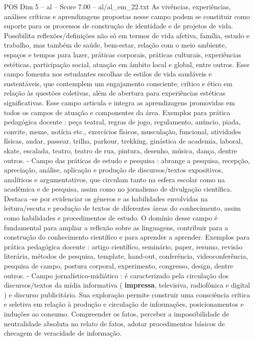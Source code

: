 \begin{textsample}{POS Dim 5 – al – Score 7.00 – al/al\_em\_22.txt}
As vivências, experiências, análises críticas e aprendizagens propostas nesse campo podem se constituir como suporte para os processos de construção de identidade e de projetos de vida.
Possibilita reflexões/definições não só em termos de vida afetiva, família, estudo e trabalho, mas também de saúde, bem-estar, relação com o meio ambiente, espaços e tempos para lazer, práticas corporais, práticas culturais, experiências estéticas, participação social, atuação em âmbito local e global, entre outros.
Esse campo fomenta nos estudantes escolhas de estilos de vida saudáveis e sustentáveis, que contemplem um engajamento consciente, crítico e ético em relação às questões coletivas, além de abertura para experiências estéticas significativas.
Esse campo articula e integra as aprendizagens promovidas em todos os campos de atuação e componentes da área.
Exemplos para prática pedagógica docente : peça teatral, regras de jogo, regulamento, anúncio, piada, convite, meme, notícia etc., exercícios físicos, musculação, funcional, atividades físicas, andar, passear, trilha, parkour, trekking, ginástica de academia, laboral, skate, escalada, teatro, teatro de rua, pintura, desenho, música, dança, dentre outros. - Campo das práticas de estudo e pesquisa : abrange a pesquisa, recepção, apreciação, análise, aplicação e produção de discursos/textos expositivos, analíticos e argumentativos, que circulam tanto na esfera escolar como na acadêmica e de pesquisa, assim como no jornalismo de divulgação científica.
Destaca -se por evidenciar os gêneros e as habilidades envolvidas na leitura/escuta e produção de textos de diferentes áreas do conhecimento, assim como habilidades e procedimentos de estudo.
O domínio desse campo é fundamental para ampliar a reflexão sobre as linguagens, contribuir para a construção do conhecimento científico e para aprender a aprender.
Exemplos para prática pedagógica docente : artigo científico, seminário, paper, resumo, revisão literária, métodos de pesquisa, template, hand-out, conferência, videoconferência, pesquisa de campo, postura corporal, experimento, congresso, design, dentre outros. - Campo jornalístico-midiático : é caracterizado pela circulação dos discursos/textos da mídia informativa ( \textbf{impressa}, televisiva, radiofônica e digital ) e discurso publicitário.
Sua exploração permite construir uma consciência crítica e seletiva em relação à produção e circulação de informações, posicionamentos e induções ao consumo.
Compreender os fatos, perceber a impossibilidade de neutralidade absoluta no relato de fatos, adotar procedimentos básicos de checagem de veracidade de informação.

\end{textsample}
